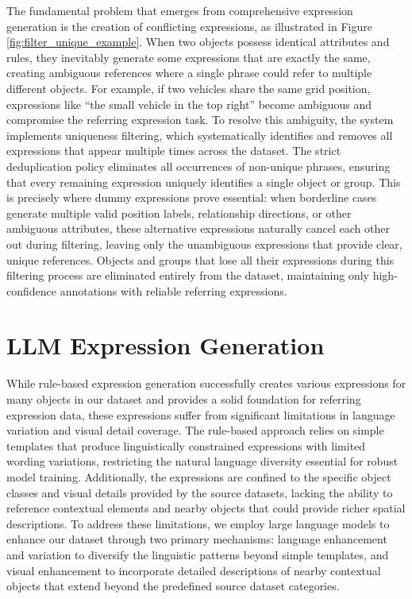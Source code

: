The fundamental problem that emerges from comprehensive expression generation is the creation of conflicting expressions, as illustrated in Figure \ref{fig:filter_unique_example}. When two objects possess identical attributes and rules, they inevitably generate some expressions that are exactly the same, creating ambiguous references where a single phrase could refer to multiple different objects. For example, if two vehicles share the same grid position, expressions like ``the small vehicle in the top right'' become ambiguous and compromise the referring expression task. To resolve this ambiguity, the system implements uniqueness filtering, which systematically identifies and removes all expressions that appear multiple times across the dataset. The strict deduplication policy eliminates all occurrences of non-unique phrases, ensuring that every remaining expression uniquely identifies a single object or group. This is precisely where dummy expressions prove essential: when borderline cases generate multiple valid position labels, relationship directions, or other ambiguous attributes, these alternative expressions naturally cancel each other out during filtering, leaving only the unambiguous expressions that provide clear, unique references. Objects and groups that lose all their expressions during this filtering process are eliminated entirely from the dataset, maintaining only high-confidence annotations with reliable referring expressions.





\section{LLM Expression Generation}

While rule-based expression generation successfully creates various expressions for many objects in our dataset and provides a solid foundation for referring expression data, these expressions suffer from significant limitations in language variation and visual detail coverage. The rule-based approach relies on simple templates that produce linguistically constrained expressions with limited wording variations, restricting the natural language diversity essential for robust model training. Additionally, the expressions are confined to the specific object classes and visual details provided by the source datasets, lacking the ability to reference contextual elements and nearby objects that could provide richer spatial descriptions. To address these limitations, we employ large language models to enhance our dataset through two primary mechanisms: language enhancement and variation to diversify the linguistic patterns beyond simple templates, and visual enhancement to incorporate detailed descriptions of nearby contextual objects that extend beyond the predefined source dataset categories.

